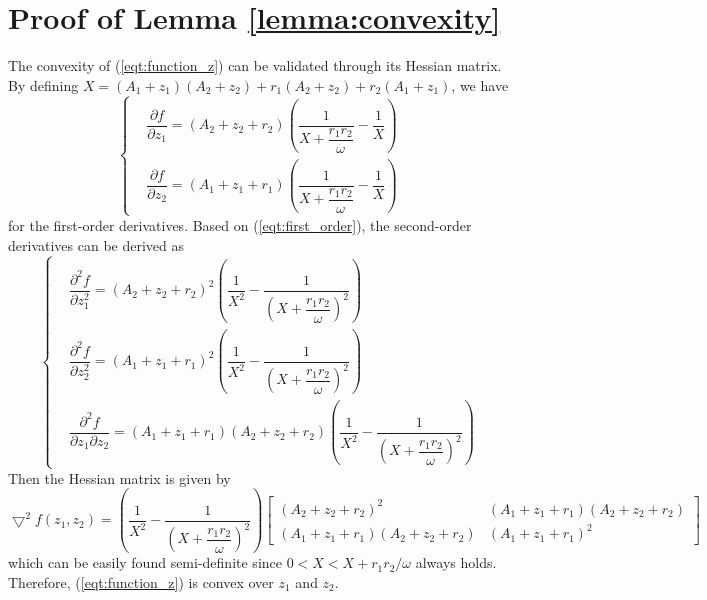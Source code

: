 \documentclass[12pt, draftclsnofoot, onecolumn]{IEEEtran}
\begin{document}
\section{Proof of Lemma \ref{lemma:convexity}}\label{app:d}
The convexity of (\ref{eqt:function_z}) can be validated through its Hessian matrix. By defining $X=(A_{1}+z_{1})(A_{2}+z_{2})+r_{1}(A_{2}+z_{2})+r_{2}(A_{1}+z_{1})$, we have
\begin{equation}\label{eqt:first_order}
\left\{
\begin{aligned}
&\dfrac{\partial f}{\partial z_{1}}=(A_{2}+z_{2}+r_{2})(\dfrac{1}{X+\dfrac{r_{1}r_{2}}{\omega}}-\dfrac{1}{X})\\
&\dfrac{\partial f}{\partial z_{2}}=(A_{1}+z_{1}+r_{1})(\dfrac{1}{X+\dfrac{r_{1}r_{2}}{\omega}}-\dfrac{1}{X})
\end{aligned}
\right.
\end{equation}
for the first-order derivatives.
Based on (\ref{eqt:first_order}), the second-order derivatives can be derived as
\begin{equation}\label{eqt:second_order}
\left\{
\begin{aligned}
&\dfrac{\partial^{2}f}{\partial z_{1}^{2}}=(A_{2}+z_{2}+r_{2})^{2}(\dfrac{1}{X^{2}}-\dfrac{1}{(X+\dfrac{r_{1}r_{2}}{\omega})^{2}})\\
&\dfrac{\partial^{2}f}{\partial z_{2}^{2}}=(A_{1}+z_{1}+r_{1})^{2}(\dfrac{1}{X^{2}}-\dfrac{1}{(X+\dfrac{r_{1}r_{2}}{\omega})^{2}})\\
&\dfrac{\partial^{2}f}{\partial z_{1}\partial z_{2}}=(A_{1}+z_{1}+r_{1})(A_{2}+z_{2}+r_{2})(\dfrac{1}{X^{2}}-\dfrac{1}{(X+\dfrac{r_{1}r_{2}}{\omega})^{2}})
\end{aligned}
\right.
\end{equation}
Then the Hessian matrix is given by
\begin{equation}
\bigtriangledown ^{2}f(z_{1},z_{2})=(\dfrac{1}{X^{2}}-\dfrac{1}{(X+\dfrac{r_{1}r_{2}}{\omega})^{2}})
\left[
\begin{array}{cc}
(A_{2}+z_{2}+r_{2})^{2} & (A_{1}+z_{1}+r_{1})(A_{2}+z_{2}+r_{2})\\ 
(A_{1}+z_{1}+r_{1})(A_{2}+z_{2}+r_{2}) & (A_{1}+z_{1}+r_{1})^{2}
\end{array}
\right]
\end{equation}
which can be easily found semi-definite since $0<X<X+r_{1}r_{2}/\omega$ always holds. Therefore, (\ref{eqt:function_z}) is convex over $z_{1}$ and $z_{2}$.
\end{document}
